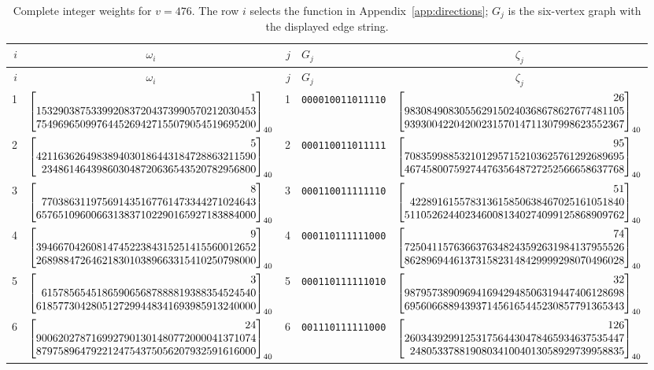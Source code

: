 \documentclass[11pt]{article}
\theoremstyle{remark}
\numberwithin{equation}{section}
\begin{document}
\clearpage
\begingroup\fontsize{7.2}{9}\selectfont
\setlength{\tabcolsep}{1.5pt}
\renewcommand{\arraystretch}{1.06}
\begin{longtable}{rcrlc}
\caption{Complete integer weights for $v=476$. The row $i$ selects the function in Appendix~\ref{app:directions}; $G_j$ is the six-vertex graph with the displayed edge string.}\label{tab:six476-weights}\\
\toprule $i$&$\omega_i$&$j$&$G_j$&$\zeta_j$\\\midrule\endfirsthead
\toprule $i$&$\omega_i$&$j$&$G_j$&$\zeta_j$\\\midrule\endhead
\bottomrule\endfoot

1&$\srgBigInt{1}{1532903875339920837204373990570212030453}{7549696509976445269427155079054519695200}$&1&\texttt{000010011011110}&$\srgBigInt{26}{9830849083055629150240368678627677481105}{9393004220420023157014711307998623552367}$\\[1pt]

2&$\srgBigInt{5}{4211636264983894030186443184728863211590}{234861464398603048720636543520782956800}$&2&\texttt{000110011011111}&$\srgBigInt{95}{7083599885321012957152103625761292689695}{4674580075927447635648727252566658637768}$\\[1pt]

3&$\srgBigInt{8}{770386311975691435167761473344271024643}{6576510960066313837102290165927183884000}$&3&\texttt{000110011111110}&$\srgBigInt{51}{422891615578313615850638467025161051840}{5110526244023460081340274099125868909762}$\\[1pt]

4&$\srgBigInt{9}{3946670426081474522384315251415560012652}{2689884726462183010389663315410250798000}$&4&\texttt{000110111111000}&$\srgBigInt{74}{7250411576366376348243592631984137955526}{8628969446137315823148429999298070496028}$\\[1pt]

5&$\srgBigInt{3}{615785654518659065687888819388354524540}{6185773042805127299448341693985913240000}$&5&\texttt{000110111111010}&$\srgBigInt{32}{9879573890969416942948506319447406128698}{6956066889439371456165445230857791365343}$\\[1pt]

6&$\srgBigInt{24}{9006202787169927901301480772000041371074}{8797589647922124754375056207932591616000}$&6&\texttt{001110111111000}&$\srgBigInt{126}{2603439299125317564430478465934637535447}{248053378819080341004013058929739958835}$\\[1pt]


\end{longtable}
\end{document}
